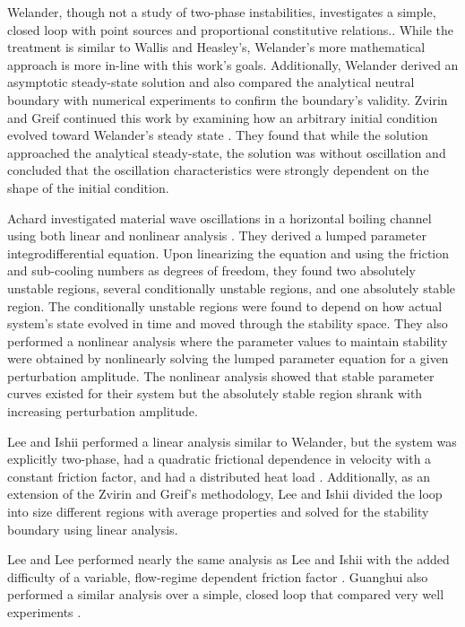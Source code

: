 Welander, though not a study of two-phase instabilities, investigates a simple, closed loop with point sources and proportional constitutive relations.\cite{welander_oscillatory_1967}.
While the treatment is similar to Wallis and Heasley's, Welander's more mathematical approach is more in-line with this work's goals.
Additionally, Welander derived an asymptotic steady-state solution and also compared the analytical neutral boundary with numerical experiments to confirm the boundary's validity.
Zvirin and Greif continued this work by examining how an arbitrary initial condition evolved toward Welander's steady state \cite{zvirin_transient_1979}.
They found that while the solution approached the analytical steady-state, the solution was without oscillation and concluded that the oscillation characteristics were strongly dependent on the shape of the initial condition.

Achard \etal investigated material wave oscillations in a horizontal boiling channel using both linear and nonlinear analysis \cite{achard_analysis_1985}.
They derived a lumped parameter integrodifferential equation.
Upon linearizing the equation and using the friction and sub-cooling numbers as degrees of freedom, they found two absolutely unstable regions, several conditionally unstable regions, and one absolutely stable region.
The conditionally unstable regions were found to depend on how actual system's state evolved in time and moved through the stability space.
They also performed a nonlinear analysis where the parameter values to maintain stability were obtained by nonlinearly solving the lumped parameter equation for a given perturbation amplitude.
The nonlinear analysis showed that stable parameter curves existed for their system but the absolutely stable region shrank with increasing perturbation amplitude.

Lee and Ishii performed a linear analysis similar to Welander, but the system was explicitly two-phase, had a quadratic frictional dependence in velocity with a constant friction factor, and had a distributed heat load \cite{sang_yong_lee_thermally_1990}.
Additionally, as an extension of the Zvirin and Greif's methodology, Lee and Ishii divided the loop into size different regions with average properties and solved for the stability boundary using linear analysis.

Lee and Lee performed nearly the same analysis as Lee and Ishii with the added difficulty of a variable, flow-regime dependent friction factor \cite{lee_linear_1991}.
Guanghui \etal also performed a similar analysis over a simple, closed loop that compared very well experiments \cite{guanghui_theoretical_2002}.

